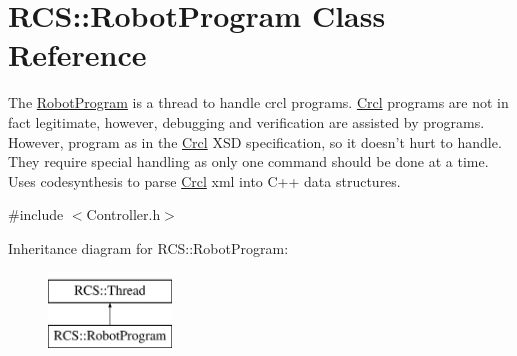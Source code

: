 \hypertarget{classRCS_1_1RobotProgram}{\section{R\-C\-S\-:\-:Robot\-Program Class Reference}
\label{classRCS_1_1RobotProgram}
}


The \hyperlink{classRCS_1_1RobotProgram}{Robot\-Program} is a thread to handle crcl programs. \hyperlink{namespaceCrcl}{Crcl} programs are not in fact legitimate, however, debugging and verification are assisted by programs. However, program as in the \hyperlink{namespaceCrcl}{Crcl} X\-S\-D specification, so it doesn't hurt to handle. They require special handling as only one command should be done at a time. Uses codesynthesis to parse \hyperlink{namespaceCrcl}{Crcl} xml into C++ data structures.  




{\ttfamily \#include $<$Controller.\-h$>$}

Inheritance diagram for R\-C\-S\-:\-:Robot\-Program\-:\begin{figure}[H]
\begin{center}
\leavevmode
\includegraphics[height=2.000000cm]{classRCS_1_1RobotProgram}
\end{center}
\end{figure}
